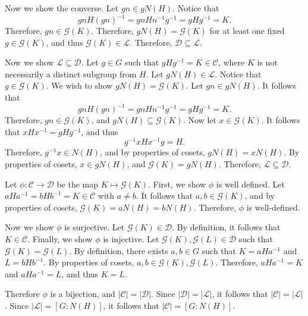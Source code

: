 \documentclass[11pt, letterpaper]{report}
\begin{document}
Now we show the converse. Let $gn\in gN(H)$. Notice that
\[
	gnH\left( gn \right) ^{-1}=gnHn ^{-1}g^{-1}=gHg^{-1}=K
.\]
Therefore, $gn\in \mathcal{G} (K)$. Therefore, $gN(H)= \mathcal{G} (K)$ for at least one fixed $g\in \mathcal{G} (K)$, and thus $\mathcal{G} (K)\in\mathcal{L} $. Therefore, $\mathcal{D} \subseteq \mathcal{L} $.

Now we show $\mathcal{L} \subseteq \mathcal{D} $. Let $g\in G$ such that $gHg^{-1}=K\in\mathcal{C} $, where $K$ is not necessarily a distinct subgroup from $H$. Let $gN(H)\in \mathcal{L} $. Notice that $g\in \mathcal{G} (K)$. We wish to show $gN(H)=\mathcal{G} (K)$. Let $gn\in gN\left(H \right) $. It follows that
\[
	gnH\left( gn \right) ^{-1}=gnHn ^{-1}g^{-1}=gHg^{-1}=K
.\]
Therefore, $gn\in \mathcal{G} (K)$, and $gN(H)\subseteq \mathcal{G} (K)$. Now let $x\in \mathcal{G} (K)$. It follows that $xHx ^{-1}=gHg^{-1}$, and thus
\[
	g^{-1}xHx ^{-1}g=H
.\]
Therefore, $g^{-1}x\in N(H)$, and by properties of cosets, $gN(H)=xN(H)$. By properties of cosets, $x\in gN(H)$, and $\mathcal{G} (K)=gN(H)$. Therefore, $\mathcal{L} \subseteq \mathcal{D} $.

Let $\phi : \mathcal{C}  \to \mathcal{D} $ be the map $K\mapsto \mathcal{G} (K)$. First, we show $\phi $ is well defined. Let $aHa^{-1}=bHb^{-1}=K\in \mathcal{C} $ with $a\neq b$. It follows that $a,b\in \mathcal{G} (K)$, and by properties of cosets, $\mathcal{G} (K)=aN(H)=bN(H)$. Therefore, $\phi $ is well-defined.

Now we show $\phi $ is surjective. Let $\mathcal{G} (K)\in \mathcal{D} $. By definition, it follows that $K\in \mathcal{C} $. Finally, we show $\phi $ is injective. Let $\mathcal{G} (K),\mathcal{G} (L)\in \mathcal{D} $ such that $\mathcal{G} (K)=\mathcal{G} (L)$. By definition, there exists $a,b\in G$ such that $K=aHa^{-1}$ and $L=bHb^{-1}$. By properties of cosets, $a,b\in \mathcal{G} (K),\mathcal{G} (L)$. Therefore, $aHa^{-1}=K$ and $aHa^{-1}=L$, and thus $K=L$.

Therefore $\phi $ is a bijection, and $\left| \mathcal{C}  \right| =\left| \mathcal{D}  \right| $. Since $\left| \mathcal{D}  \right| =\left| \mathcal{L}  \right| $, it follows that $\left| \mathcal{C}  \right| =\left| \mathcal{L}  \right| $. Since $\left| \mathcal{L}  \right| =\left[ G : N(H) \right] $, it follows that $\left| \mathcal{C}  \right| =\left[ G : N(H) \right] $.
\end{document}
